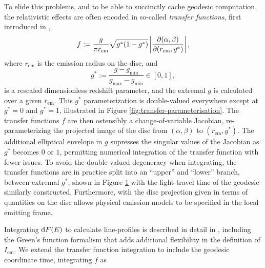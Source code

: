 To elide this problems, and to be able to succinctly cache geodesic computation, the relativistic effects are often encoded in so-called \emph{transfer functions}, first introduced in \cite{cunningham_effects_1975},
\begin{equation}
    f:=\frac{g}{\pi r_\text{em}} \sqrt{g^\ast(1 - g^\ast)} \left\lvert \frac{\partial (\alpha, \beta)}{\partial (r_\text{em}, g^\ast)} \right\rvert,
\end{equation}
where $r_\text{em}$ is the emission radius on the disc, and
\begin{equation}
    g^\ast := \frac{g - g_\text{min}}{g_\text{max} - g_\text{min}} \in [0, 1],
\end{equation}
is a rescaled dimensionless redshift parameter, and the extremal $g$ is calculated over a given $r_\text{em}$. This $g^\ast$ parameterization is double-valued everywhere except at $g^\ast = 0$ and $g^\ast = 1$, illustrated in Figure \ref{fig:transfer-parameterisation}. The transfer functions $f$ are then ostensibly a change-of-variable Jacobian, re-parameterizing the projected image of the disc from $(\alpha, \beta)$ to $(r_\text{em}, g^\ast)$. The additional elliptical envelope in $g$ supresses the singular values of the Jacobian as $g^\ast$ becomes $0$ or $1$, permitting numerical integration of the transfer function with fewer issues. To avoid the double-valued degeneracy when integrating, the transfer functions are in practice split into an ``upper'' and ``lower'' branch, between extremal $g^\ast$, shown in Figure \ref{fig:transfer-functions} with the light-travel time of the geodesic similarly constructed. Furthermore, with the disc projection given in terms of quantities on the disc allows physical emission models to be specified in the local emitting frame.

\begin{figure}
    \centering
    \caption{}
    \label{fig:transfer-functions}
\end{figure}

Integrating $\text{d} F(E)$ to calculate line-profiles is described in detail in \cite{dauser_broad_2010}, including the Green's function formalism that adds additional flexibility in the definition of $I_\text{em}$. We extend the transfer function integration to include the geodesic coordinate time, integrating $f$ as


